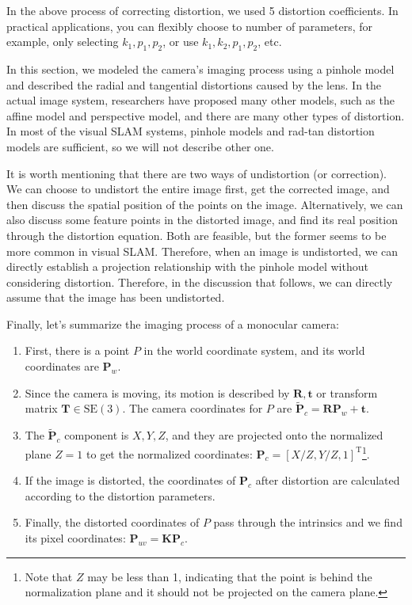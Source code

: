 In the above process of correcting distortion, we used 5 distortion coefficients. In practical applications, you can flexibly choose to number of parameters, for example, only selecting $k_1, p_1, p_2$, or use $k_1, k_2, p_1, p_2$, etc.

In this section, we modeled the camera's imaging process using a pinhole model and described the radial and tangential distortions caused by the lens. In the actual image system, researchers have proposed many other models, such as the affine model and perspective model, and there are many other types of distortion. In most of the visual SLAM systems, pinhole models and rad-tan distortion models are sufficient, so we will not describe other one.

It is worth mentioning that there are two ways of undistortion (or correction). We can choose to undistort the entire image first, get the corrected image, and then discuss the spatial position of the points on the image. Alternatively, we can also discuss some feature points in the distorted image, and find its real position through the distortion equation. Both are feasible, but the former seems to be more common in visual SLAM. Therefore, when an image is undistorted, we can directly establish a projection relationship with the pinhole model without considering distortion. Therefore, in the discussion that follows, we can directly assume that the image has been undistorted.

Finally, let's summarize the imaging process of a monocular camera:

\begin{enumerate}
	\item First, there is a point $P$ in the world coordinate system, and its world coordinates are $\mathbf{P}_w$.
	\item Since the camera is moving, its motion is described by $\mathbf{R}, \mathbf{t}$ or  transform matrix $\mathbf{T} \in \mathrm{SE}(3)$. The camera coordinates for $P$ are $\mathbf{\tilde{P}}_c = \mathbf{R} \mathbf{P}_w + \mathbf{t}$.
	\item The $\mathbf{\tilde{P}}_c$ component is $X,Y,Z$, and they are projected onto the normalized plane $Z=1$ to get the normalized coordinates: $\mathbf{P}_c = [X/Z, Y/Z, 1]^\mathrm{T}$\footnote{Note that $Z$ may be less than 1, indicating that the point is behind the normalization plane and it should not be projected on the camera plane.}.
	\item If the image is distorted, the coordinates of $\mathbf{P}_c$ after distortion are calculated according to the distortion parameters.
	\item Finally, the distorted coordinates of $P$ pass through the intrinsics and we find its pixel coordinates: $\mathbf{P}_{uv} = \mathbf{K} \mathbf{P}_c$.
\end{enumerate}

